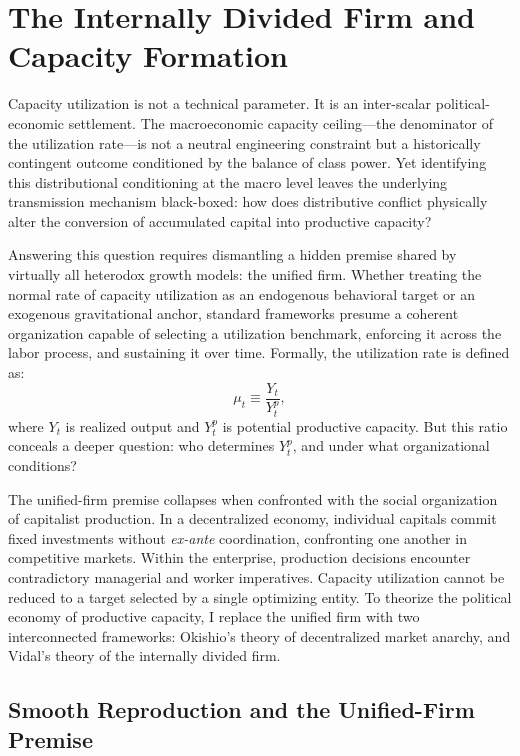 \section{The Internally Divided Firm and Capacity Formation}
\label{sec:2:divided_firm}

Capacity utilization is not a technical parameter. It is an
inter-scalar political-economic settlement. The macroeconomic
capacity ceiling---the denominator of the utilization rate---is
not a neutral engineering constraint but a historically contingent
outcome conditioned by the balance of class power. Yet identifying
this distributional conditioning at the macro level leaves the
underlying transmission mechanism black-boxed: how
does distributive conflict physically alter the conversion of
accumulated capital into productive capacity?

Answering this question requires dismantling a hidden premise
shared by virtually all heterodox growth models: the unified
firm. Whether treating the normal rate of capacity utilization
as an endogenous behavioral target or an exogenous gravitational
anchor, standard frameworks presume a coherent organization
capable of selecting a utilization benchmark, enforcing it across
the labor process, and sustaining it over time. Formally, the
utilization rate is defined as:
%
\begin{equation}\label{eq:utilization}
	\mu_t \equiv \frac{Y_t}{Y^p_t},
\end{equation}
%
\noindent where $Y_t$ is realized output and $Y^p_t$ is potential
productive capacity. But this ratio conceals a deeper question:
who determines $Y^p_t$, and under what organizational conditions?

The unified-firm premise collapses when confronted with the
social organization of capitalist production. In a decentralized
economy, individual capitals commit fixed investments without
\textit{ex-ante} coordination, confronting one another in
competitive markets. Within the enterprise, production decisions
encounter contradictory managerial and worker imperatives.
Capacity utilization cannot be reduced to a target selected by
a single optimizing entity. To theorize the political economy
of productive capacity, I replace the unified firm with two
interconnected frameworks: Okishio's theory of decentralized
market anarchy, and Vidal's theory of the internally divided
firm.

\subsection{Smooth Reproduction and the Unified-Firm Premise}

